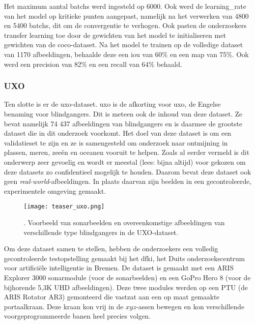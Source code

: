 Het maximum aantal \glspl{batch} werd ingesteld op 6000. Ook werd de \gls{learning_rate} van het model op kritieke punten aangepast, namelijk na het verwerken van 4800 en 5400 \glspl{batch}, dit om de convergentie te verhogen. Ook pasten de onderzoekers transfer learning toe door de gewichten van het model te initialiseren met gewichten van de \gls{coco}-dataset. Na het model te trainen op de volledige dataset van 1170 afbeeldingen, behaalde deze een \gls{iou} van 60\% en een \gls{map} van 75\%. Ook werd een \gls{precision} van 82\% en een \gls{recall} van 64\% behaald. \autocite{Pessanha_Santos_2024}

\subsubsection{UXO}

Ten slotte is er de \acrshort{uxo}-dataset. \acrshort{uxo} is de afkorting voor \acrlong{uxo}, de Engelse benaming voor \glspl{blindganger}. Dit is meteen ook de inhoud van deze dataset. Ze bevat namelijk 74 437 afbeeldingen van \glspl{blindganger} en is daarmee de grootste dataset die in dit onderzoek voorkomt. Het doel van deze dataset is om een validatieset te zijn en ze is samengesteld om onderzoek naar ontmijning in plassen, meren, zeeën en oceanen vooruit te helpen. Zoals al eerder vermeld is dit onderwerp zeer gevoelig en wordt er meestal (lees: bijna altijd) voor gekozen om deze datasets zo confidentieel mogelijk te houden. Daarom bevat deze dataset ook geen \emph{real-world}-afbeeldingen. In plaats daarvan zijn beelden in een gecontroleerde, experimentele omgeving gemaakt. \autocite{Dahn_2024_UXO}

\begin{figure}[H]
    \centering
    \texttt{[image: teaser\_uxo.png]}
    \caption[Voorbeeld van sonarbeelden \& afbeeldingen in de UXO-dataset]{\label{fig:uxo_teaser}. Voorbeeld van sonarbeelden en overeenkomstige afbeeldingen van verschillende type \glspl{blindganger} in de UXO-dataset. \autocite{Dahn_2024_UXO}}
\end{figure}

Om deze dataset samen te stellen, hebben de onderzoekers een volledig gecontroleerde testopstelling gemaakt bij het \gls{dfki}, het Duits onderzoekscentrum voor artificiële intelligentie in Bremen. De dataset is gemaakt met een ARIS Explorer 3000 sonarmodule (voor de sonarbeelden) en een GoPro Hero 8 (voor de bijhorende 5,3K UHD afbeeldingen). Deze twee modules werden op een \gls{PTU} (de ARIS Rotator AR3) gemonteerd die vastzat aan een op maat gemaakte \gls{portaalkraan}. Deze kraan kon vrij in de $xyz$-assen bewegen en kon verschillende voorgeprogrammeerde banen heel precies volgen. 

